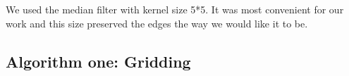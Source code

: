 We used the median filter with kernel size 5*5. It was most convenient for our work and 
this size preserved the edges the way we would like it to be. 

\subsection{Algorithm one: Gridding}

